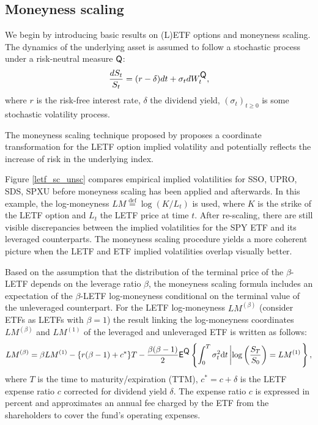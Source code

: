 \documentclass{rQUF2e}
\newcommand{\E}{\mathop{\mbox{\sf E}}}
\newcommand{\QQ}{\mathop{\mbox{\sf Q}}}
\theoremstyle{plain}
\theoremstyle{definition}
\begin{document}
	\subsection{Moneyness scaling}
	We begin by introducing basic results on (L)ETF options and moneyness scaling. The dynamics of the underlying asset is assumed to follow a stochastic process under a risk-neutral measure $\QQ$:
	\begin{equation}
	\frac{dS_t}{S_t} = (r-\delta)dt + \sigma_t dW^{\QQ}_t,
	\label{underl}
	\end{equation}
	where $r$ is the risk-free interest rate, $\delta$ the dividend yield, $(\sigma_t)_{t \geq 0}$ is some stochastic volatility process.
	
	The moneyness scaling technique proposed by \citet{leung_sircar} proposes a coordinate transformation for the LETF option implied volatility and potentially reflects the increase of risk in the underlying index. 
	
	Figure \ref{letf_sc_unsc} compares empirical implied volatilities for SSO, UPRO, SDS, SPXU before moneyness scaling has been applied and afterwards. In this example, the log-moneyness $LM \stackrel{\operatorname{def}}{=} \log (K/L_t)$ is used, where $K$ is the strike of the LETF option and $L_t$ the LETF price at time $t$. After re-scaling, there are still visible discrepancies between the implied volatilities for the  SPY ETF and its leveraged counterparts. The moneyness scaling procedure yields a more coherent picture when the LETF and ETF implied volatilities overlap visually better.
	
	Based on the assumption that the distribution of the terminal price of the $\beta$-LETF depends on the leverage ratio $\beta$, the moneyness scaling formula includes an expectation of the $\beta$-LETF log-moneyness conditional on the terminal value of the unleveraged counterpart. For the LETF log-moneyness $LM^{(\beta)}$ (consider ETFs as LETFs with $\beta = 1$) the result linking the log-moneyness coordinates $LM^{(\beta)}$ and $LM^{(1)}$ of the leveraged and unleveraged ETF is written as follows:
	\begin{equation}
	LM^{(\beta)} = \beta LM^{(1)} - \{r(\beta - 1) + c^{*}\} T - \frac{\beta(\beta - 1)}{2} {\E}^{\QQ}\left\{ \int_{0}^{T}\sigma_t^2 \text{d} t \left| \log \left(\frac{S_T}{S_0}\right) = LM^{(1)} \right.\right\}, 
	\label{monsc_unlev}
	\end{equation}
	where $T$ is the time to maturity/expiration (TTM), $c^{*} = c + \delta$ is the LETF expense ratio $c$ corrected for dividend yield $\delta$. The expense ratio $c$ is expressed in percent and approximates an annual fee charged by the ETF from the shareholders to cover the fund's operating expenses.
	
\end{document}
